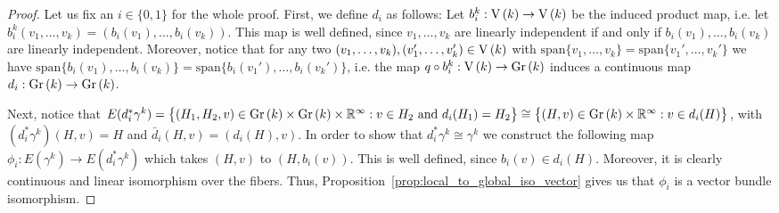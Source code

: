\begin{proof} Let us fix an $i\in\{0,1\}$ for the whole proof. First, we define $d_i$ as follows: Let $b_i^k:\St{k}\to\St{k}$ be the induced product map, i.e. let $b_i^k(v_1,\ldots,v_k)=(b_i(v_1),\ldots,b_i(v_k))$. This map is well defined, since $v_1,\ldots,v_k$ are linearly independent if and only if $b_i(v_1),\ldots,b_i(v_k)$ are linearly independent. Moreover, notice that for any two $(v_1,\ldots,v_k),(v_1',\ldots,v_k')\in\St{k}$ with $\mathrm{span}\{v_1,\ldots,v_k\}=\mathrm{span}\{v_1',\ldots,v_k'\}$ we have $\mathrm{span}\{b_i(v_1),\ldots,b_i(v_k)\}=\mathrm{span}\{b_i(v_1'),\ldots,b_i(v_k')\}$, i.e. the map $q\circ b_i^k:\St{k}\to\Gr{k}$ induces a continuous map $d_i:\Gr{k}\to\Gr{k}$.

Next, notice that $E(d_i^*\gamma^k)=\big\{(H_1,H_2,v)\in\Gr{k}\times\Gr{k}\times\mathbb{R}^{\infty}:v\in H_2\text{ and }d_i(H_1)=H_2\big\}\cong\big\{(H,v)\in\Gr{k}\times\mathbb{R}^{\infty}:v\in d_i(H)\big\}$, with $(d_i^*\gamma^k)(H,v)=H$ and $\bar{d}_i(H,v)=(d_i(H),v)$. In order to show that $d_i^*\gamma^k\cong\gamma^k$ we construct the following map $\phi_i:E(\gamma^k)\to E(d_i^*\gamma^k)$ which takes $(H,v)$ to $(H,b_i(v))$. This is well defined, since $b_i(v)\in d_i(H)$. Moreover, it is clearly continuous and linear isomorphism over the fibers. Thus, Proposition~\ref{prop:local_to_global_iso_vector} gives us that $\phi_i$ is a vector bundle isomorphism.


\end{proof}
